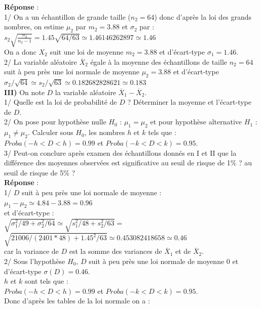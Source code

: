 \documentclass[a4paper,11pt]{book}
\begin{document}
\begin{itemize}
{\bf R\'eponse} :\\
1/ On a un \'echantillon de grande taille ($n_2=64$) donc d'apr\`es la loi des 
grands nombres, on  estime $\mu_2$ par $m_2=3.88$ et $\sigma_2$ par :\\ 
$s_2\sqrt {\frac{n_2}{n_2-1}}=1.45\sqrt{64/63}\simeq 1.46146262897\simeq 1.46$\\ 
On a donc 
$X_2$ suit une loi de moyenne $m_2=3.88$ et d'\'ecart-type 
$\sigma_1=1.46$. \\
2/ La variable al\'eatoire $\overline X_2$ \'egale \`a la moyenne des 
\'echantillons de taille $n_2=64$ suit \`a peu pr\`es une loi normale de 
moyenne $\mu_2=3.88$ et d'\'ecart-type 
$\sigma_2/\sqrt{64} \simeq s_2/\sqrt{63}\simeq 0.182682828621\simeq 0.183$\\
 {\bf III)} On note $D$ la variable al\'eatoire $\overline X_1-\overline X_2$.\\
1/ Quelle est la loi de probabilit\'e de $D$ ? D\'eterminer la moyenne et 
l'\'ecart-type de $D$.\\
2/ On pose pour hypoth\`ese nulle $H_0$ : $\mu_1=\mu_2$ et pour hypoth\`ese 
alternative $H_1$ : $\mu_1 \neq \mu_2$. Calculer sous $H_0$, les nombres 
$h$ et $k$ tels que :\\
$Proba(-h<D<h)=0.99$ et 
$Proba(-k<D<k)=0.95$.\\
3/ Peut-on conclure apr\`es examen des \'echantillons donn\'es en I et II 
que la diff\'erence des moyennes observ\'ees est significative au seuil de 
risque de 1\% ? au seuil de risque de 5\% ?\\
{\bf R\'eponse} :\\
1/ $D$ suit \`a peu pr\`es une loi 
normale de moyenne :\\
 $\mu_1-\mu_2 \simeq 4.84-3.88=0.96$ \\
et d'\'ecart-type :\\
$\sqrt{\sigma_1^2/49+\sigma_2^2/64} \simeq \sqrt{s_1^2/48+s_2^2/63}=$\\
$\sqrt{21006/(2401*48)+1.45^2/63} \simeq 0.453082418658\simeq 0.46$ \\
car la variance de $D$ est la somme des variances de  $\overline X_1$ et 
de $\overline X_2$.\\
2/ Sous l'hypoth\`ese $H_0$, $D$ suit \`a peu pr\`es une loi normale 
de moyenne  $0$ et d'\'ecart-type $\sigma(D)=0.46$.\\
$h$ et $k$ sont tels que :\\
$Proba(-h<D<h)=0.99$ et 
$Proba(-k<D<k)=0.95$.\\
Donc d'apr\`es les tables de la loi normale on a :\\

\end{itemize}
\end{document}
